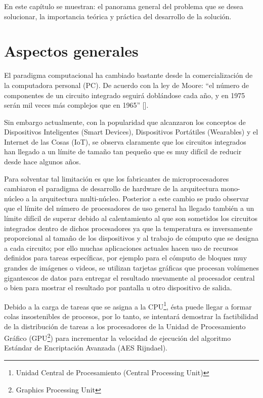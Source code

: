 \documentclass[../main/main.tex]{subfiles}
\begin{document}
\espacio

  En este capítulo se muestran: el panorama general del problema que se desea solucionar, la importancia teórica y práctica del desarrollo de la solución.

  \section{Aspectos generales}

  El paradigma computacional ha cambiado bastante desde la comercialización de la computadora personal (PC). De acuerdo con la ley de Moore: ``el número de componentes de un circuito integrado seguirá doblándose cada año, y en 1975 serán mil veces más complejos que en 1965'' [\cite[p.~2]{article:ley_de_moore}].

  Sin embargo actualmente, con la popularidad que alcanzaron los conceptos de Dispositivos Inteligentes (Smart Devices), Dispositivos Portátiles (Wearables) y el Internet de las Cosas (IoT), se observa claramente que los circuitos integrados han llegado a un límite de tamaño tan pequeño que es muy difícil de reducir desde hace algunos años.

  Para solventar tal limitación es que los fabricantes de microprocesadores cambiaron el paradigma de desarrollo de hardware de la arquitectura mono-núcleo a la arquitectura multi-núcleo. Posterior a este cambio se pudo observar que el límite del número de procesadores de uso general ha llegado también a un límite difícil de superar debido al calentamiento al que son sometidos los circuitos integrados dentro de dichos procesadores ya que la temperatura es inversamente proporcional al tamaño de los dispositivos y al trabajo de cómputo que se designa a cada circuito; por ello muchas aplicaciones actuales hacen uso de recursos definidos para tareas específicas, por ejemplo para el cómputo de bloques muy grandes de imágenes o videos, se utilizan tarjetas gráficas que procesan volúmenes gigantescos de datos para entregar el resultado nuevamente al procesador central o bien para mostrar el resultado por pantalla u otro dispositivo de salida.

  Debido a la carga de tareas que se asigna a la CPU\footnote{Unidad Central de Procesamiento (Central Processing Unit)}, ésta puede llegar a formar colas insostenibles de procesos, por lo tanto, se intentará demostrar la factibilidad de la distribución de tareas a los procesadores de la Unidad de Procesamiento Gráfico (GPU\footnote{Graphics Processing Unit}) para incrementar la velocidad de ejecución del algoritmo Estándar de Encriptación Avanzada (AES Rijndael).
\end{document}
